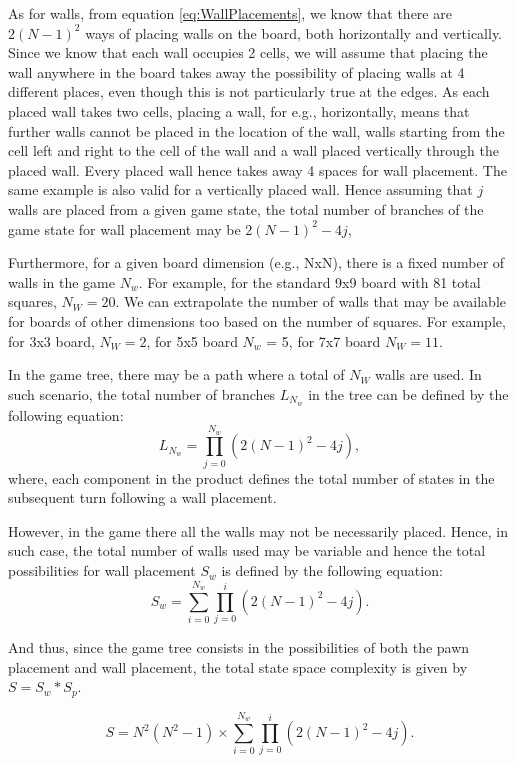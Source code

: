 As for walls, from equation \ref{eq:WallPlacements}, we know that there are $2(N-1)^2$ ways of placing walls on the board, both horizontally and vertically. Since we know that each wall occupies 2 cells, we will assume that placing the wall anywhere in the board takes away the possibility of placing walls at 4 different places, even though this is not particularly true at the edges. As each placed wall takes two cells, placing a wall, for e.g., horizontally, means that further walls cannot be placed in the location of the wall, walls starting from the cell left and right to the cell of the wall and a wall placed vertically through the placed wall. Every placed wall hence takes away 4 spaces for wall placement. The same example is also valid for a vertically placed wall. Hence assuming that $j$ walls are placed from a given game state, the total number of branches of the game state for wall placement may be $2(N-1)^2 - 4j$,

Furthermore, for a given board dimension (e.g., NxN), there is a fixed number of walls in the game $N_w$. For example, for the standard 9x9 board with 81 total squares, $N_W = 20$. We can extrapolate the number of walls that may be available for boards of other dimensions too based on the number of squares. For example, for 3x3 board, $N_W = 2$, for 5x5 board $N_w$ = 5, for 7x7 board $N_W = 11$.

In the game tree, there may be a path where a total of $N_W$ walls are used. In such scenario, the total number of branches $L_{N_w}$ in the tree can be defined by the following equation:
\begin{equation}
    L_{N_w} = \prod_{j=0}^{N_w} (2(N-1)^2 - 4j),
\end{equation}
where, each component in the product defines the total number of states in the subsequent turn following a wall placement.

However, in the game there all the walls may not be necessarily placed. Hence, in such case, the total number of walls used may be variable and hence the total possibilities for wall placement $S_w$ is defined by the following equation:
\begin{equation}
    S_w = \sum_{i=0}^{N_w}\prod_{j=0}^{i}(2(N-1)^2 - 4j).
\end{equation}

And thus, since the game tree consists in the possibilities of both the pawn placement and wall placement, the total state space complexity is given by $S = S_w * S_p$.

\begin{equation}
    S = N^2(N^2 -1) \times \sum_{i=0}^{N_w}\prod_{j=0}^{i}(2(N-1)^2 - 4j).
\end{equation}


